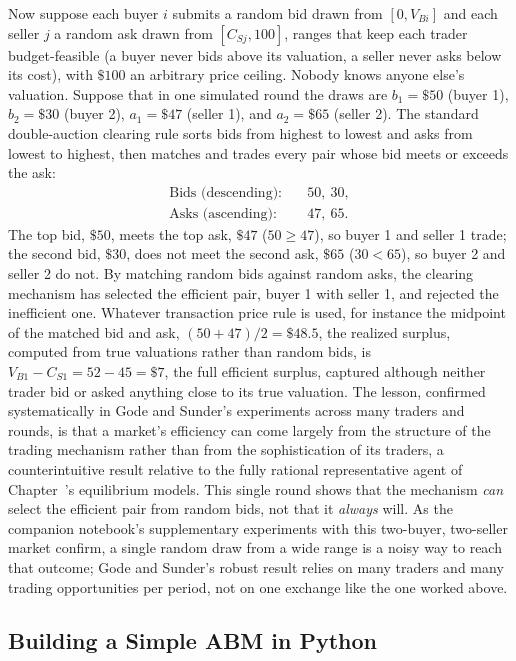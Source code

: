 \documentclass[../ai_in_finance]{subfiles}
\begin{document}
Now suppose each buyer $i$ submits a random bid drawn from $[0, V_{Bi}]$ and each seller $j$ a random ask drawn from $[C_{Sj}, 100]$, ranges that keep each trader budget-feasible (a buyer never bids above its valuation, a seller never asks below its cost), with $\$100$ an arbitrary price ceiling. Nobody knows anyone else's valuation. Suppose that in one simulated round the draws are $b_1=\$50$ (buyer 1), $b_2=\$30$ (buyer 2), $a_1=\$47$ (seller 1), and $a_2=\$65$ (seller 2). The standard double-auction clearing rule sorts bids from highest to lowest and asks from lowest to highest, then matches and trades every pair whose bid meets or exceeds the ask:
\begin{align*}
\text{Bids (descending):} &\quad 50, \ 30, \\
\text{Asks (ascending):} &\quad 47, \ 65.
\end{align*}
The top bid, $\$50$, meets the top ask, $\$47$ ($50 \ge 47$), so buyer 1 and seller 1 trade; the second bid, $\$30$, does not meet the second ask, $\$65$ ($30 < 65$), so buyer 2 and seller 2 do not. By matching random bids against random asks, the clearing mechanism has selected the efficient pair, buyer 1 with seller 1, and rejected the inefficient one. Whatever transaction price rule is used, for instance the midpoint of the matched bid and ask, $(50+47)/2 = \$48.5$, the realized surplus, computed from true valuations rather than random bids, is $V_{B1} - C_{S1} = 52 - 45 = \$7$, the full efficient surplus, captured although neither trader bid or asked anything close to its true valuation. The lesson, confirmed systematically in Gode and Sunder's experiments across many traders and rounds, is that a market's efficiency can come largely from the structure of the trading mechanism rather than from the sophistication of its traders, a counterintuitive result relative to the fully rational representative agent of Chapter~'s equilibrium models. This single round shows that the mechanism \emph{can} select the efficient pair from random bids, not that it \emph{always} will. As the companion notebook's supplementary experiments with this two-buyer, two-seller market confirm, a single random draw from a wide range is a noisy way to reach that outcome; Gode and Sunder's robust result relies on many traders and many trading opportunities per period, not on one exchange like the one worked above.

\subsection{Building a Simple ABM in Python}
\label{sec:abm-python}
\end{document}
